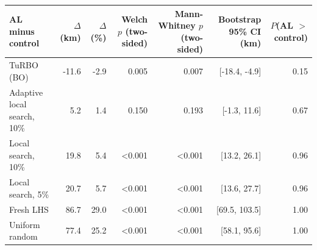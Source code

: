 \begin{tabular}{@{}lrrrrrr@{}}
\toprule
AL minus control & $\Delta$ (km) & $\Delta$ (\%) & Welch $p$ (two-sided) & Mann-Whitney $p$ (two-sided) & Bootstrap 95\% CI (km) & $P$(AL $>$ control) \\
\midrule
TuRBO (BO) & -11.6 & -2.9 & 0.005 & 0.007 & [-18.4, -4.9] & 0.15 \\
Adaptive local search, 10\% & 5.2 & 1.4 & 0.150 & 0.193 & [-1.3, 11.6] & 0.67 \\
Local search, 10\% & 19.8 & 5.4 & <0.001 & <0.001 & [13.2, 26.1] & 0.96 \\
Local search, 5\% & 20.7 & 5.7 & <0.001 & <0.001 & [13.6, 27.7] & 0.96 \\
Fresh LHS & 86.7 & 29.0 & <0.001 & <0.001 & [69.5, 103.5] & 1.00 \\
Uniform random & 77.4 & 25.2 & <0.001 & <0.001 & [58.1, 95.6] & 1.00 \\
\bottomrule
\end{tabular}
